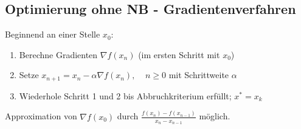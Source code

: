 \subsection{Optimierung ohne NB - Gradientenverfahren}
Beginnend an einer Stelle \(x_0\): 
\begin{enumerate}
\item Berechne Gradienten \(\nabla f(x_n)\) (im ersten Schritt mit \(x_0\))
\item Setze \(x_{n+1} = x_n - \alpha \nabla f(x_n), \;\;\;\; n \geq 0\) mit Schrittweite \(\alpha\)
\item Wiederhole Schritt 1 und 2 bis Abbruchkriterium erfüllt; \(x^* = x_k\)
\end{enumerate}

Approximation von \(\nabla f(x_0)\) durch \(\frac{f(x_n) - f(x_{n-1})}{x_n - x_{n-1}}\) möglich.